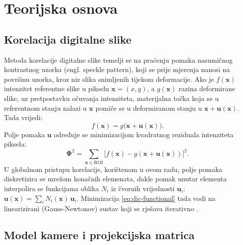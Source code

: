 \section{Teorijska osnova}
\label{sec:teorija}

\subsection{Korelacija digitalne slike}

Metoda korelacije digitalne slike temelji se na praćenju pomaka
nasumičnog kontrastnog uzorka (engl. speckle pattern),
koji se prije mjerenja nanosi na površinu uzorka, kroz niz slika
snimljenih tijekom deformacije.
Ako je $f(\mathbf{x})$
intenzitet referentne slike u pikselu $\mathbf{x}=(x,y)$,
a $g(\mathbf{x})$ razina
deformirane slike, uz pretpostavku očuvanja intenziteta,
materijalna točka koja se u
referentnom stanju nalazi u $\mathbf{x}$ pomiče se u deformiranom stanju u
$\mathbf{x}+\mathbf{u}(\mathbf{x})$. Tada vrijedi:
\begin{equation}
  f(\mathbf{x}) = g\big(\mathbf{x}+\mathbf{u}(\mathbf{x})\big).
  \label{eq:opt-flow}
\end{equation}
Polje pomaka $\mathbf{u}$ određuje se minimizacijom kvadratnog reziduala intenziteta piksela:
\begin{equation}
  \boldsymbol{\Phi}^2 = \sum_{\mathbf{x}\in\text{ROI}}
  \big[ f(\mathbf{x}) - g(\mathbf{x}+\mathbf{u}(\mathbf{x})) \big]^2 .
  \label{eq:dic-functional}
\end{equation}
U globalnom pristupu korelacije, korištenom u ovom radu, polje pomaka
diskretizira se mrežom konačnih elemenata, dakle pomak unutar elementa interpolira se
funkcijama oblika $N_i$ iz čvornih vrijednosti $\mathbf{u}_i$:
$\mathbf{u}(\mathbf{x})=\sum_i N_i(\mathbf{x})\,\mathbf{u}_i$. Minimizacija
\eqref{eq:dic-functional} tada vodi na linearizirani (Gauss-Newtonov) sustav koji se
rješava iterativno \cite{sutton2009}\cite{hild2006}.

\subsection{Model kamere i projekcijska matrica}

